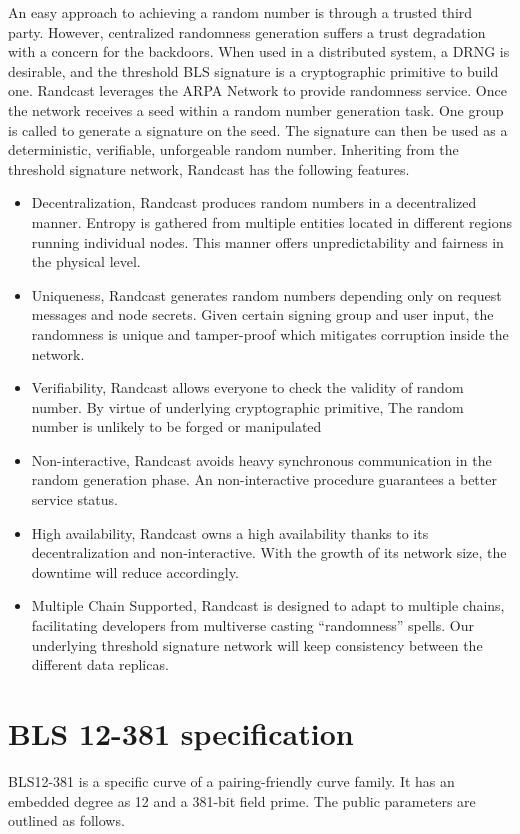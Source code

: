 \documentclass[11pt]{article}
\begin{document}
An easy approach to achieving a random number is through a trusted third party. However, centralized randomness generation suffers a trust degradation with a concern for the backdoors. When used in a distributed system, a DRNG is desirable, and the threshold BLS signature is a cryptographic primitive to build one. Randcast leverages the ARPA Network to provide randomness service. Once the network receives a seed within a random number generation task. One group is called to generate a signature on the seed. The signature can then be used as a deterministic, verifiable, unforgeable random number. Inheriting from the threshold signature network, Randcast has the following features.

\begin{itemize}
    \item Decentralization, Randcast produces random numbers in a decentralized manner. Entropy is gathered from multiple entities located in different regions running individual nodes. This manner offers unpredictability and fairness in the physical level.
    \item Uniqueness, Randcast generates random numbers depending only on request messages and node secrets. Given certain signing group and user input, the randomness is unique and tamper-proof which mitigates corruption inside the network.
    \item Verifiability, Randcast allows everyone to check the validity of random number. By virtue of underlying cryptographic primitive, The random number is unlikely to be forged or manipulated
    \item Non-interactive, Randcast avoids heavy synchronous communication in the random generation phase. An non-interactive procedure guarantees a better service status.
    \item High availability, Randcast owns a high availability thanks to its decentralization and non-interactive. With the growth of its network size, the downtime will reduce accordingly.
    \item Multiple Chain Supported, Randcast is designed to adapt to multiple chains, facilitating developers from multiverse casting “randomness” spells. Our underlying threshold signature network will keep consistency between the different data replicas.
\end{itemize}

\appendix
\section{BLS 12-381 specification}
BLS12-381 is a specific curve of a pairing-friendly curve family. It has an embedded degree as 12 and a 381-bit field prime. The public parameters are outlined as follows\cite{sean2017bls}.
\end{document}
